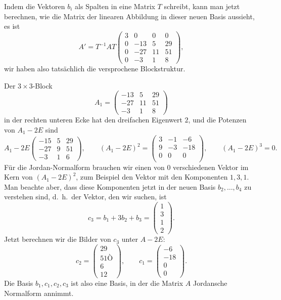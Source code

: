 \begin{loesung}
Indem die Vektoren $b_i$ als Spalten in eine Matrix $T$ schreibt, kann man
jetzt berechnen, wie die Matrix der linearen Abbildung in dieser neuen
Basis aussieht, es ist
\[
A'=T^{-1}AT
\left(
\begin{array}{r|rrr}
    3&   0&   0&   0\\
\hline
    0& -13&   5&  29\\
    0& -27&  11&  51\\
    0&  -3&   1&   8
\end{array}
\right),
\]
wir haben also tatsächlich die versprochene Blockstruktur.

Der $3\times 3$-Block
\[
A_1
=
\begin{pmatrix}
 -13&   5&  29\\
 -27&  11&  51\\
  -3&   1&   8
\end{pmatrix}
\]
in der rechten unteren Ecke hat den dreifachen Eigenwert $2$, 
und die Potenzen von $A_1-2E$ sind
\[
A_1-2E
\begin{pmatrix}
  -15 &  5&  29\\
  -27 &  9&  51\\
   -3 &  1&   6
\end{pmatrix}
,\qquad
(A_1-2E)^2
=
\begin{pmatrix}
    3 & -1 & -6\\
    9 & -3 &-18\\
    0 &  0 &  0\\
\end{pmatrix}
,\qquad
(A_1-2E)^3=0.
\]
Für die Jordan-Normalform brauchen wir einen von $0$ verschiedenen
Vektor im Kern von $(A_1-2E)^2$, zum Beispiel den Vektor mit den
Komponenten $1,3,1$.
Man beachte aber, dass diese Komponenten jetzt in der neuen Basis
$b_2,\dots,b_4$ zu verstehen sind, d.~h.~der Vektor, den wir suchen, ist
\[
c_3
=
b_1+ 3b_2+b_3
=
\begin{pmatrix}1\\3\\1\\2\end{pmatrix}.
\]
Jetzt berechnen wir die Bilder von $c_3$ unter $A-2E$:
\[
c_2
=
\begin{pmatrix}
29\\51Ò\\6\\12
\end{pmatrix}
,\qquad
c_1
=
\begin{pmatrix}
-6\\-18\\0\\0
\end{pmatrix}.
\]
Die Basis $b_1,c_1,c_2,c_3$ ist also eine Basis, in der die Matrix $A$
Jordansche Normalform annimmt.


\end{loesung}
